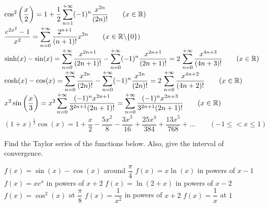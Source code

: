 \begin{Answer}

    \Question $\cos^2\left(\dfrac{x}{2} \right) = 1 + \dfrac{1}{2} \displaystyle\sum_{n=1}^{+\infty} (-1)^n \dfrac{x^{2n}}{(2n)!}  \qquad (x\in\mathbb{R})$
    \Question $\dfrac{e^{2x^2}-1}{x^2} = \displaystyle\sum_{n=0}^{+\infty} \dfrac{2^{n+1}}{(n+1)!} x^{2n}  \qquad (x\in\mathbb{R}\backslash\{0\})$
    \Question $\sinh (x) - \sin (x) = \displaystyle\sum_{n=0}^{+\infty} \dfrac{x^{2n+1}}{(2n+1)!} -  \displaystyle\sum_{n=0}^{+\infty} (-1)^n \dfrac{x^{2n+1}}{(2n+1)!} = 2 \, \displaystyle\sum_{n=0}^{+\infty} \dfrac{x^{4n+3}}{(4n+3)!} \qquad (x\in\mathbb{R})$
    \Question $\cosh (x)- \cos (x) = \displaystyle\sum_{n=0}^{+\infty} \dfrac{x^{2n}}{(2n)!} -  \displaystyle\sum_{n=0}^{+\infty} (-1)^n \dfrac{x^{2n}}{(2n)!} = 2 \, \displaystyle\sum_{n=0}^{+\infty} \dfrac{x^{4n+2}}{(4n+2)!} \qquad (x\in\mathbb{R})$
    \Question $ x^2 \sin \left(\dfrac{x}{3} \right) = x^2 \displaystyle\sum_{n=0}^{+\infty} \dfrac{(-1)^n x^{2n+1}}{3^{2n+1} (2n+1)!} = \displaystyle\sum_{n=0}^{+\infty} \dfrac{(-1)^n x^{2n+3}}{3^{2n+1} (2n+1)!}   \qquad (x\in\mathbb{R})$
    \Question $(1+x)^{\frac{1}{2}} \cos (x) =1 + \dfrac{x}{2} - \dfrac{5x^2}{8} - \dfrac{3x^3}{16} +\dfrac{25x^4}{384} + \dfrac{13x^5}{768}  + \ldots  \qquad (-1\leq < x \leq 1)$
    
\end{Answer}

\begin{Exercise} Find the Taylor series of the functions below. Also, give the interval of convergence.
\begin{multicols}{2}
    \Question[difficulty = 1] $f(x) = \sin (x) - \cos (x) $ around $\dfrac{\pi}{4}$
    \Question[difficulty = 2] $f(x)= x \ln (x)$ in powers of $x-1$
    \Question[difficulty = 2] $f(x) = x e^x$ in powers of $x+2$
    \Question[difficulty = 3] $f(x) = \ln(2+x)$  in powers of $x-2$
    \Question[difficulty = 3] $f(x) =  \cos^2 (x) $ at $\dfrac{\pi}{8}$
    \Question[difficulty = 2] $f(x) = \dfrac{1}{x^2}$  in powers of $x+2$  
    \Question[difficulty = 1] $f(x) = \dfrac{1}{x}$  at $1$ 
    \EndCurrentQuestion
\end{multicols}
\end{Exercise}

